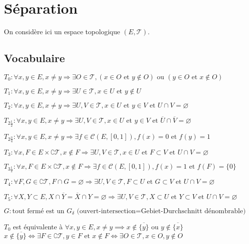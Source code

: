 \documentclass[a4paper, 11pt, french]{book}
\newenvironment{itemise}{\itemize}{\enditemize}
\theoremstyle{plain} %
\theoremstyle{definition} %
\theoremstyle{remark} %
\newcommand{\1}{\mathds{1}}
\newcommand\vide{\varnothing}
\newcommand{\cont}{\mathcal{C}}
\newcommand\et{\text{ et }}
\newcommand\ou{\text{ ou }}
\begin{document}
\chapter{Séparation}
On considère ici un espace topologique $(E, \mathscr{T})$.

\section{Vocabulaire}
\begin{itemise}
	\item $T_0:\forall x, y\in E, x\neq y\Rightarrow\exists O\in\mathscr{T}, (x\in O\et y\notin O)\ou(y\in O\et x\notin O)$
	\item $T_1:\forall x, y\in E, x\neq y\Rightarrow\exists U\in\mathscr{T}, x\in U\et y\notin U$
	\item $T_2:\forall x, y\in E, x\neq y\Rightarrow\exists U, V\in\mathscr{T}, x\in U\et y\in V\et U\cap V=\vide$
	\item $T_{2\frac{1}{2}}:\forall x, y\in E, x\neq y\Rightarrow\exists U, V\in\mathscr{T}, x\in U\et y\in V\et\overline{U}\cap\overline{V}=\vide$
	\item $T_{2\frac{3}{4}}:\forall x, y\in E, x\neq y\Rightarrow\exists f\in\cont(E, [0, 1]), f(x)=0\et f(y)=1$
	\item $T_3:\forall x, F\in E\times\complement\mathscr{T}, x\notin F\Rightarrow\exists U, V\in\mathscr{T}, x\in U\et F\subset V\et U\cap V=\vide$
	\item $T_{3\frac{1}{2}}:\forall x, F\in E\times\complement\mathscr{T}, x\notin F\Rightarrow\exists f\in\mathcal{C}(E, [0, 1]), f(x)=1\et f(F)=\{0\}$
	\item $T_4:\forall F, G\in\complement\mathscr{T}, F\cap G=\vide\Rightarrow\exists U, V\in\mathscr{T}, F\subset U\et G\subset V\et U\cap V=\vide$
	\item $T_5:\forall X, Y\subset E, X\cap\overline{Y}=\overline{X}\cap Y=\vide\Rightarrow\exists U, V\in\mathscr{T}, X\subset U\et Y\subset V\et U\cap V=\vide$
	\item $G:\text{tout fermé est un $G_\delta$ (ouvert-intersection=Gebiet-Durchschnitt dénombrable)}$
\end{itemise}

\proposition
$T_0$ est équivalente à $\forall x, y\in E, x\neq y\implies x\notin\overline{\{y\}}\ou y\notin\overline{\{x\}}$
\demonstration
$x\notin\overline{\{y\}}
\iff\exists F\in\complement\mathscr{T}, y\in F\et x\notin F
\iff\exists O\in\mathscr{T}, x\in O, y\notin O$
\end{document}
